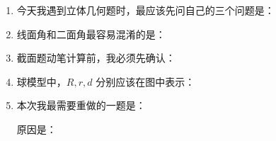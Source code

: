 \documentclass[11pt,a4paper]{ctexart}
\begin{document}
\begin{enumerate}[label=\arabic*. , leftmargin=2em, itemsep=1.25em]
  \item 今天我遇到立体几何题时，最应该先问自己的三个问题是：

  \vspace{1.2cm}

  \item 线面角和二面角最容易混淆的是：

  \vspace{1.2cm}

  \item 截面题动笔计算前，我必须先确认：

  \vspace{1.2cm}

  \item 球模型中，\(R,r,d\) 分别应该在图中表示：

  \vspace{1.2cm}

  \item 本次我最需要重做的一题是：\blank{4cm}

  原因是：\blank{10cm}

  \vspace{1.0cm}
\end{enumerate}
\end{document}
